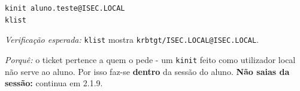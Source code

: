 
\begin{lstlisting}[style=bashstyle]
kinit aluno.teste@ISEC.LOCAL
klist
\end{lstlisting}

\emph{Verificação esperada:} \texttt{klist} mostra \texttt{krbtgt/\allowbreak{}ISEC.LOCAL@ISEC.LOCAL}.

\emph{Porquê:} o ticket pertence a quem o pede - um \texttt{kinit} feito como utilizador local não serve ao aluno. Por isso faz-se \textbf{dentro} da sessão do aluno. \textbf{Não saias da sessão:} continua em 2.1.9.

